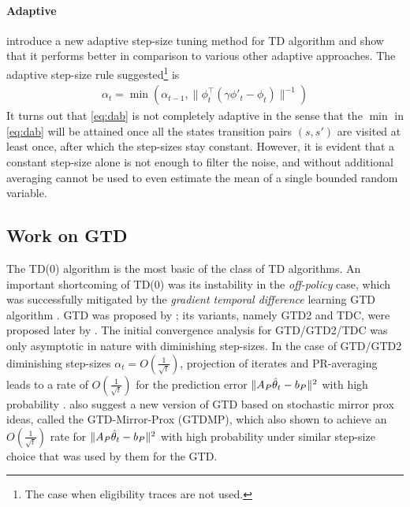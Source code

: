 \paragraph{Adaptive}  \citet{dab} introduce a new adaptive step-size tuning method for TD algorithm and show that it performs better in comparison to various other adaptive approaches. The adaptive step-size rule suggested\footnote{The case when eligibility traces are not used.} is 
\begin{align}\label{eq:dab}
\alpha_t=\min(\alpha_{t-1},\parallel\phi^\top_t(\gamma\phi'_t-\phi_t)\parallel^{-1})
\end{align} 
It turns out that \eqref{eq:dab} is not completely adaptive in the sense that the $\min$ in \eqref{eq:dab} will be attained once all the states transition pairs $(s,s')$ are visited at least once, after which the step-sizes stay constant. However, it is evident that a constant step-size alone is not enough to filter the noise, and without additional averaging cannot be used to even estimate the mean of a single bounded random variable. 
\subsection{Work on GTD} The TD(0) algorithm is the most basic of the class of TD algorithms. 
An important shortcoming of TD(0) was its instability in the \emph{off-policy} case, which was successfully mitigated by the \emph{gradient temporal difference} learning GTD algorithm \cite{gtd2}. GTD was proposed by \citet{gtd}; its variants, namely GTD2 and TDC, were proposed later by \citet{gtd2}. 
The initial convergence analysis for GTD/GTD2/TDC was only asymptotic in nature \cite{gtd,gtd2} with diminishing step-sizes.
In the case of GTD/GTD2 diminishing step-sizes $\alpha_t=O(\frac{1}{\sqrt{t}})$, projection of iterates and PR-averaging leads to a rate of $O(\frac{1}{\sqrt{t}})$ 
for the prediction error $\| A_P\hat{\theta}_t-b_P\|^2$ with high probability \cite{gtdmp}. 
\citet{gtdmp} also suggest a new version of GTD based on stochastic mirror prox ideas, called the GTD-Mirror-Prox (GTDMP), 
which also shown to achieve an $O(\frac{1}{\sqrt{t}})$ rate for $\| A_P\hat{\theta}_t-b_P\|^2$ with high probability under similar step-size choice that was used by them for the GTD. 


